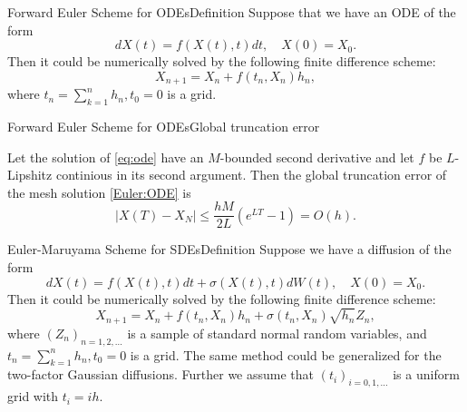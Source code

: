 \begin{frame}{Forward Euler Scheme for ODEs}{Definition}
    Suppose that we have an ODE of the form
    \begin{equation}
        dX(t) = f(X(t), t)dt, \quad X(0) = X_0. \label{eq:ode}
    \end{equation}
    Then it could be numerically solved by the following finite difference scheme:
    \begin{equation}
        X_{n+1} = X_n + f(t_n, X_n)h_n, \label{Euler:ODE}
    \end{equation}
    where $t_n = \sum_{k=1}^n h_n, t_0 = 0$ is a grid. 
\end{frame}

\begin{frame}{Forward Euler Scheme for ODEs}{Global truncation error}
    \begin{lemma}
        Let the solution of \eqref{eq:ode} have an $M$-bounded second derivative and let $f$ be $L$-Lipshitz continious in its second argument. Then the global truncation error of the mesh solution \eqref{Euler:ODE} is
        \begin{equation}
            \left|X(T) - X_N\right| \leq \frac{hM}{2L}\left(e^{LT} - 1\right) = O(h).
        \end{equation}
    \end{lemma}
\end{frame}

\begin{frame}{Euler-Maruyama Scheme for SDEs}{Definition}
    Suppose we have a diffusion of the form 
    \begin{equation*}
        dX(t) = f(X(t), t)dt + \sigma(X(t), t)dW(t), \quad X(0) = X_0.
    \end{equation*}
    Then it could be numerically solved by the following finite difference scheme:
    \begin{equation}
        X_{n+1} = X_n + f(t_n, X_n)h_n + \sigma(t_n, X_n) \sqrt{h_n} Z_n, \label{Euler:SDE}
    \end{equation}
    where $(Z_n)_{n=1, 2, \dots}$ is a sample of standard normal random variables, and $t_n = \sum_{k=1}^n h_n, t_0 = 0$ is a grid.
    The same method could be generalized for the two-factor Gaussian diffusions. Further we assume
    that $(t_i)_{i = 0, 1, \dots}$ is a uniform grid with $t_i = ih$.
\end{frame}

